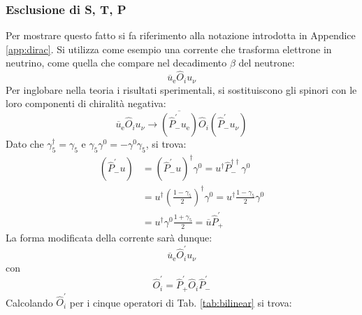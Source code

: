 \documentclass{subnucbo}
\begin{document}
\subsubsection{Esclusione di S, T, P}
Per mostrare questo fatto si fa riferimento alla notazione introdotta in Appendice \ref{app:dirac}. Si utilizza come esempio una corrente che trasforma elettrone in neutrino, come quella che compare nel decadimento $\beta$ del neutrone:
\begin{equation}
        \overline { u } _ { \mathrm { e } } \hat { O } _ { i } u _ { \nu }
        \label{eq:e_nu_current}
\end{equation}
Per inglobare nella teoria i risultati sperimentali, si sostituiscono gli spinori con le loro componenti di chiralità negativa:
\begin{equation}
        \overline { u } _ { \mathrm { e } } \hat { O } _ { i } u _ { \nu } \rightarrow \overline { \left( \hat { P } _ { - } ^ { \prime } u _ { \mathrm { e } } \right) } \hat { O } _ { i } \left( \hat { P } _ { - } ^ { \prime } u _ { \nu } \right)
\end{equation}
Dato che $\gamma _ { 5 } ^ { \dagger } = \gamma _ { 5 }$ e $\gamma _ { 5 } \gamma ^ { 0 } = - \gamma ^ { 0 } \gamma _ { 5 }$, si trova:
\begin{equation}
        \begin{aligned}
                \left( \hat { P } _ { - } ^ { \prime } u \right) & = \left( \hat { P } _ { - } ^ { \prime } u \right) ^ { \dagger } \gamma ^ { 0 } = u ^ { \dagger } \hat { P } _ { - } ^ { \dagger \dagger } \gamma ^ { 0 } \\ & = u ^ { \dagger } \left( \frac { 1 - \gamma _ { 5 } } { 2 } \right) ^ { \dagger } \gamma ^ { 0 } = u ^ { \dagger } \frac { 1 - \gamma _ { 5 } } { 2 } \gamma ^ { 0 } \\ & = u ^ { \dagger } \gamma ^ { 0 } \frac { 1 + \gamma _ { 5 } } { 2 } = \overline { u } \hat { P } _ { + } ^ { \prime }
        \end{aligned}
\end{equation}
La forma modificata della corrente sarà dunque:
\begin{equation}
        \overline { u } _ { \mathrm { e } } \hat { O } _ { i } ^ { \prime } u _ { \nu }
\end{equation}
con
\begin{equation}
        \hat { O } _ { i } ^ { \prime } = \hat { P } _ { + } ^ { \prime } \hat { O } _ { i } \hat { P } _ { - } ^ { \prime }
\end{equation}
Calcolando $\hat { O } _ { i } ^ { \prime }$ per i cinque operatori di Tab. \ref{tab:bilinear} si trova:
\end{document}
